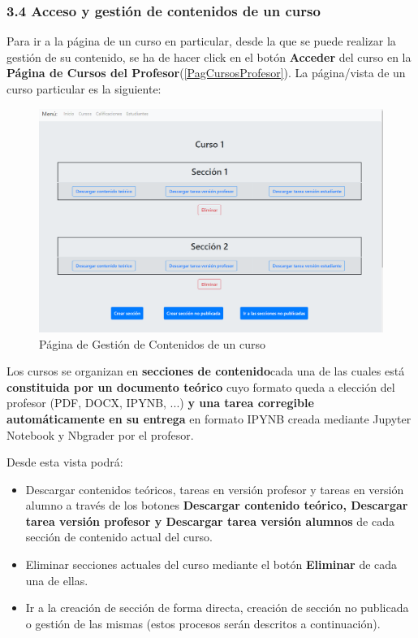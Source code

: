\subsubsection{3.4 Acceso y gestión de contenidos de un curso}
Para ir a la página de un curso en particular, desde la que se puede realizar la gestión de su contenido, se ha de hacer click en el botón \textbf{Acceder} del curso en la \textbf{Página de Cursos del Profesor}(\ref{PagCursosProfesor}). La página/vista de un curso particular es la siguiente:
\begin{figure}[H]
\centering
\includegraphics[width=\textwidth]{img/imgs-memoria/CursoIndividual.PNG}
\caption{Página de Gestión de Contenidos de un curso}
\label{PagContProf}
\end{figure}
Los cursos se organizan en \textbf{secciones de contenido}cada una de las cuales está \textbf{constituida por un documento teórico} cuyo formato queda a elección del profesor (PDF, DOCX, IPYNB, ...) \textbf{y una tarea corregible automáticamente en su entrega} en formato IPYNB creada mediante Jupyter Notebook y Nbgrader por el profesor. 


Desde esta vista podrá:
\begin{itemize}
\tightlist
\item Descargar contenidos teóricos, tareas en versión profesor y tareas en versión alumno a través de los botones \textbf{Descargar contenido teórico, Descargar tarea versión profesor y Descargar tarea versión alumnos} de cada sección de contenido actual del curso.
\item Eliminar secciones actuales del curso mediante el botón \textbf{Eliminar} de cada una de ellas.
\item Ir a la creación de sección de forma directa, creación de sección no publicada o gestión de las mismas (estos procesos serán descritos a continuación).
\end{itemize}

